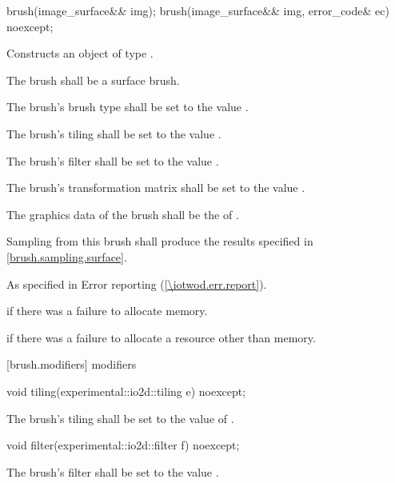 \begin{itemdecl}
brush(image_surface&& img);
brush(image_surface&& img, error_code& ec) noexcept;
\end{itemdecl}
\begin{itemdescr}
\pnum
\pnum
\effects
Constructs an object of type .

\pnum
The brush shall be a surface brush.

\pnum
The brush's brush type shall be set to the value .

\pnum
The brush's tiling shall be set to the value .

\pnum
The brush's filter shall be set to the value .

\pnum
The brush's transformation matrix shall be set to the value .

\pnum
The graphics data of the brush shall be the \underlyingimagesurface of .

\pnum
\remarks
Sampling from this brush shall produce the results specified in \ref{brush.sampling.surface}.

\pnum
\throws
As specified in Error reporting (\ref{\iotwod.err.report}).

\pnum
\errors
{} if there was a failure to allocate memory.

 if there was a failure to allocate a resource other than memory.
\end{itemdescr}

 [brush.modifiers]{ modifiers}

\begin{itemdecl}
void tiling(experimental::io2d::tiling e) noexcept;
\end{itemdecl}
\begin{itemdescr}
\pnum
\effects
The brush's tiling shall be set to the value of .
\end{itemdescr}

\begin{itemdecl}
void filter(experimental::io2d::filter f) noexcept;
\end{itemdecl}
\begin{itemdescr}
\pnum
\effects
The brush's filter shall be set to the value .
\end{itemdescr}

